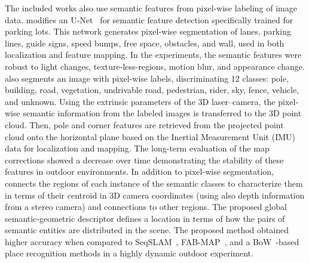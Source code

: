 The included works also use semantic features from pixel-wise labeling of image data.
\cite{qin-et-al:2020:9340939} modifies an U-Net~\parencite{original:unet} for semantic feature detection specifically trained for parking lots. This network generates pixel-wise segmentation of lanes, parking lines, guide signs, speed bumps, free space, obstacles, and wall, used in both localization and feature mapping. In the experiments, the semantic features were robust to light changes, texture-less-regions, motion blur, and appearance change.
\cite{berrio-et-al:2021:3094485} also segments an image with pixel-wise labels, discriminating 12 classes: pole, building, road, vegetation, undrivable road, pedestrian, rider, sky, fence, vehicle, and unknown. Using the extrinsic parameters of the 3D laser--camera, the pixel-wise semantic information from the labeled images is transferred to the 3D point cloud. Then, pole and corner features are retrieved from the projected point cloud onto the horizontal plane based on the Inertial Measurement Unit (IMU) data for localization and mapping. The long-term evaluation of the map corrections showed a decrease over time demonstrating the stability of these features in outdoor environments.
In addition to pixel-wise segmentation, \cite{singh-et-al:2021:9564866} connects the regions of each instance of the semantic classes to characterize them in terms of their centroid in 3D camera coordinates (using also depth information from a stereo camera) and connections to other regions. The proposed global semantic-geometric descriptor defines a location in terms of how the pairs of semantic entities are distributed in the scene. The proposed method obtained higher accuracy when compared to SeqSLAM~\parencite{discussion:seqslam}, FAB-MAP~\parencite{discussion:fab-map}, and a BoW~\parencite{discussion:bow}-based place recognition methods in a highly dynamic outdoor experiment.

